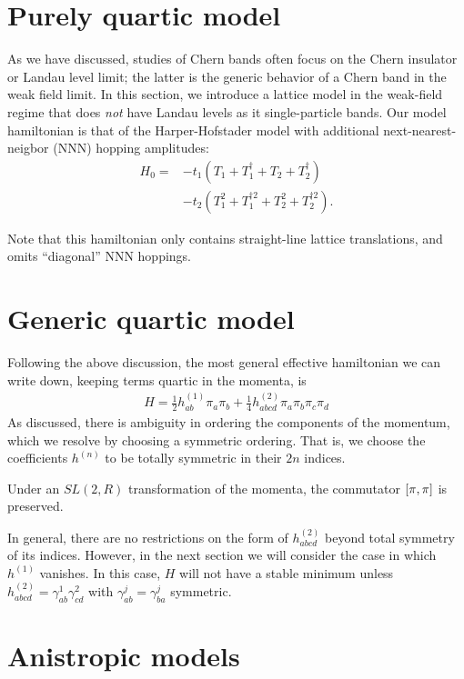\documentclass[aps,prb,twocolumn,letterpaper,twoside,nobalancelastpage,groupedaddress,amsmath,amssymb,floatfix,citeautoscript]{revtex4-1}
\begin{document}
\section{Purely quartic model}
As we have discussed, studies of Chern bands often focus on the Chern insulator or Landau level limit; the latter is the generic behavior of a Chern band in the weak field limit. In this section, we introduce a lattice model in the weak-field regime that does \textit{not} have Landau levels as it single-particle bands. Our model hamiltonian is that of the Harper-Hofstader model with additional next-nearest-neigbor (NNN) hopping amplitudes:
\begin{align*}
H_0 = &-t_1 \left(T_1 + T_1^{\dag} + T_2 + T_2^{\dag}\right)\\ &- t_2 \left(T_1^{2} + T_1^{\dag 2} + T_2^{2} + T_2^{\dag 2}\right).
\end{align*}

Note that this hamiltonian only contains straight-line lattice translations, and omits ``diagonal'' NNN hoppings. 





\section{Generic quartic model}
Following the above discussion, the most general effective hamiltonian we can write down, keeping terms quartic in the momenta, is 
\begin{align*}
H = \frac{1}{2}h^{(1)}_{ab} \pi_a \pi_b + \frac{1}{4}h^{(2)}_{abcd} \pi_a \pi_b \pi_c \pi_d
\end{align*}
As discussed, there is ambiguity in ordering the components of the momentum, which we resolve by choosing a symmetric ordering. That is, we choose the coefficients $h^{(n)}$ to be totally symmetric in their $2n$ indices.

Under an $SL(2,R)$ transformation of the momenta, the commutator $\comm{\pi}{\pi}$ is preserved.

In general, there are no restrictions on the form of $h^{(2)}_{abcd}$ beyond total symmetry of its indices. However, in the next section we will consider the case in which $h^{(1)}$ vanishes. In this case, $H$ will not have a stable minimum unless $h^{(2)}_{abcd} = \gamma^1_{ab}\gamma^2_{cd}$ with $\gamma^j_{ab} = \gamma^{j}_{ba}$ symmetric.






\section{Anistropic models}

\begin{acknowledgments}

\end{acknowledgments}


\end{document}
